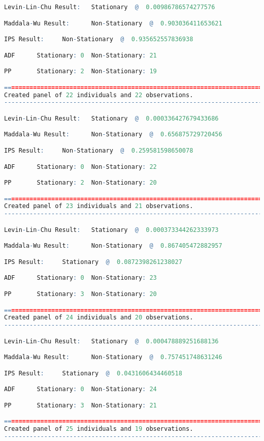 \begin{lstlisting}[language=R]
Levin-Lin-Chu Result:   Stationary  @  0.00986786574277576

Maddala-Wu Result:      Non-Stationary  @  0.903036411653621

IPS Result:     Non-Stationary  @  0.935652557836938

ADF      Stationary: 0  Non-Stationary: 21

PP       Stationary: 2  Non-Stationary: 19

=========================================================================
Created panel of 22 individuals and 22 observations.
-------------------------------------------------------------------------

Levin-Lin-Chu Result:   Stationary  @  0.000336427679433686

Maddala-Wu Result:      Non-Stationary  @  0.656875729720456

IPS Result:     Non-Stationary  @  0.259581598650078

ADF      Stationary: 0  Non-Stationary: 22

PP       Stationary: 2  Non-Stationary: 20

=========================================================================
Created panel of 23 individuals and 21 observations.
-------------------------------------------------------------------------

Levin-Lin-Chu Result:   Stationary  @  0.000373344262333973

Maddala-Wu Result:      Non-Stationary  @  0.867405472882957

IPS Result:     Stationary  @  0.0872398261238027

ADF      Stationary: 0  Non-Stationary: 23

PP       Stationary: 3  Non-Stationary: 20

=========================================================================
Created panel of 24 individuals and 20 observations.
-------------------------------------------------------------------------

Levin-Lin-Chu Result:   Stationary  @  0.000478889251688136

Maddala-Wu Result:      Non-Stationary  @  0.757451748631246

IPS Result:     Stationary  @  0.0431606434460518

ADF      Stationary: 0  Non-Stationary: 24

PP       Stationary: 3  Non-Stationary: 21

=========================================================================
Created panel of 25 individuals and 19 observations.
-------------------------------------------------------------------------


\end{lstlisting}
